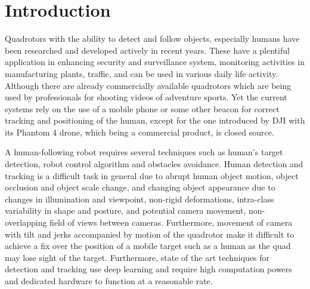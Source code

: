 \chapter{Introduction}
	Quadrotors with the ability to detect and follow objects, especially humans have been researched and developed actively in recent years. These have a plentiful application in enhancing security and surveillance system, monitoring activities in manufacturing plants, traffic, and can be used in various daily life activity. Although there 
	are already commercially available quadrotors which are being used by professionals for shooting videos of adventure sports. Yet the current systems rely on the use of a mobile phone or some other beacon for correct tracking and positioning of the human, except for the one introduced by DJI with its Phantom 4 drone, which being a commercial product, is closed source.
	
	A human-following robot requires several techniques such as human’s target detection, robot control algorithm and obstacles avoidance. Human detection and tracking is a difficult task in general due to abrupt human object motion, object occlusion and object scale change, and changing object appearance due to changes in illumination and
	viewpoint, non-rigid deformations, intra-class variability in shape and posture, and potential camera movement, non-overlapping field of views between cameras. Furthermore, movement of camera with tilt and jerks accompanied by motion of the quadrotor make it difficult to achieve a fix over the position of a mobile target such as a human as the quad
	may lose sight of the target. Furthermore, state of the art techniques for detection and tracking use deep learning and require high computation powers and dedicated hardware to function at a reasonable rate.


